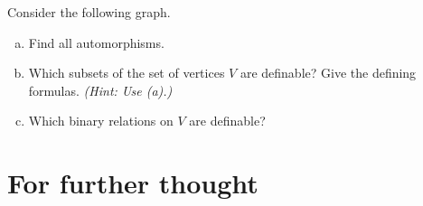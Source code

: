 \begin{problem}

    Consider the following graph.
    \smallskip
    
    \begin{minipage}{.72\textwidth}
        \begin{enumerate}[(a)]
            \item Find all automorphisms.
            \item Which subsets of the set of vertices $V$ are definable? Give the defining formulas. {\it (Hint: Use (a).)}
            \item Which binary relations on $V$ are definable?
        \end{enumerate}
    \end{minipage}%
    \begin{minipage}{.28\textwidth}        
        \vspace{-12pt}\hspace{12pt}
    \end{minipage}%

\end{problem}



\section*{For further thought}



